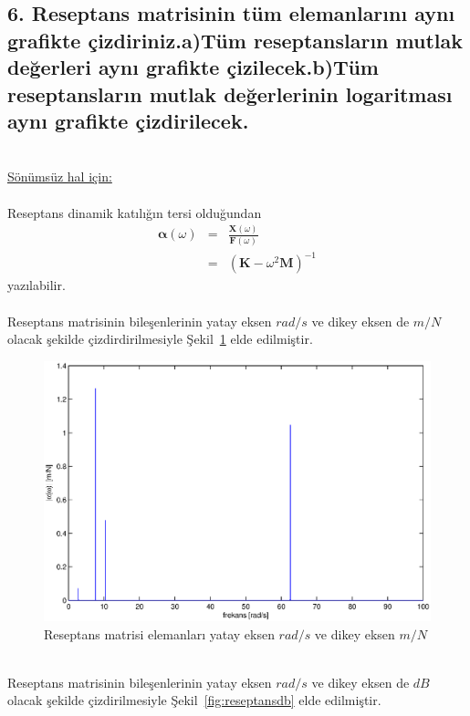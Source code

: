 \documentclass[a4paper]{report}
\begin{document}
\subsection*{6. Reseptans matrisinin tüm elemanlarını aynı grafikte çizdiriniz.a)Tüm reseptansların mutlak değerleri aynı grafikte çizilecek.b)Tüm reseptansların mutlak değerlerinin logaritması aynı grafikte çizdirilecek.}~\\
\underline{Sönümsüz hal için:}\\~\\
Reseptans dinamik katılığın tersi olduğundan 
\begin{eqnarray*}
\mathbf{\alpha}\left(\omega\right)&=&\frac{\mathbf{X}\left(\omega\right)}{\mathbf{F}\left(\omega\right)}\\
&=&\left(\mathbf{K}-\omega^2\mathbf{M}\right)^{-1}
\end{eqnarray*}
yazılabilir.\\~\\
Reseptans matrisinin bileşenlerinin yatay eksen ${rad}/{s}$ ve dikey eksen de ${m}/{N}$ olacak şekilde çizdirdirilmesiyle Şekil~\ref{fig:reseptans} elde edilmiştir.
\begin{figure}[H]
\shorthandoff{=}
\centerline{
{\includegraphics[width=1.3\textwidth]{./reseptans.eps}}}
\caption[Reseptans matrisi elemanları]{Reseptans matrisi elemanları yatay eksen ${rad}/{s}$ ve dikey eksen ${m}/{N}$}
\label{fig:reseptans}
\end{figure}\clearpage~\\
Reseptans matrisinin bileşenlerinin yatay eksen ${rad}/{s}$ ve dikey eksen de $dB$ olacak şekilde çizdirilmesiyle Şekil~\ref{fig:reseptansdb} elde edilmiştir.
\end{document}
